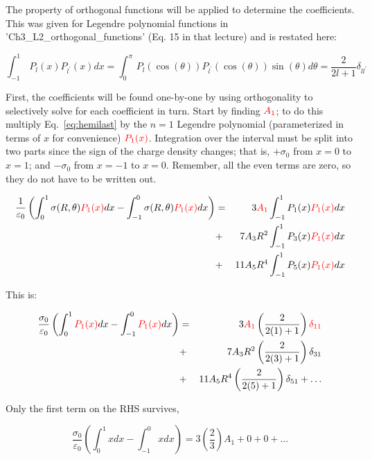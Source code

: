 \documentclass[12pt]{article}
\begin{document}
\begin{flushleft}
The property of orthogonal functions will be applied to determine the coefficients.  This was given for Legendre polynomial functions in 'Ch3\_L2\_orthogonal\_functions' (Eq. 15 in that lecture) and is restated here:

\begin{equation*}
\int_{-1}^{1} \, P_{l}(x)P_{l^{\prime}}(x) dx = \int_{0}^{\pi} \, P_{l}(\cos{(\theta)})P_{l^{\prime}}(\cos{(\theta)})\sin{(\theta)}d\theta = \frac{2}{2l+1} \delta_{ll^{\prime}}
\end{equation*}

First, the coefficients will be found one-by-one by using orthogonality to selectively solve for each coefficient in turn.  Start by finding $\textcolor{red} {A_{1}}$; to do this multiply Eq.~\ref{eq:hemilast} by the $n=1$ Legendre polynomial (parameterized in terms of $x$ for convenience) $\textcolor{red} {P_{1}(x)}$.  Integration over the interval must be split into two parts since the sign of the charge density changes; that is,  $+\sigma_{0}$ from $x=0$ to $x=1$; and $-\sigma_{0}$ from $x=-1$ to $x=0$.  Remember, all the even terms are zero, so they do not have to be written out.

\begin{eqnarray*}
\frac{1}{\varepsilon_{0}}\left( \int_{0}^{1} \sigma(R,\theta)\textcolor{red} {P_{1}(x)} dx -  \int_{-1}^{0} \sigma(R,\theta) \textcolor{red} {P_{1}(x)} dx \right) & = & 3\textcolor{red} {A_{1}} \int_{-1}^{1} P_{1}(x) \textcolor{red}{P_{1}(x)} dx \\
& + & 7A_{3} R^{2} \int_{-1}^{1} P_{3}(x) \textcolor{red}{P_{1}(x)} dx \\
& + & 11A_{5} R^{4} \int_{-1}^{1} P_{5}(x) \textcolor{red}{P_{1}(x)} dx 
\end{eqnarray*}

This is:

\begin{eqnarray*}
\frac{\sigma_{0}}{\varepsilon_{0}} \left( \int_{0}^{1} \textcolor{red} {P_{1}(x)} dx - \int_{-1}^{0} \textcolor{red} {P_{1}(x)} dx \right) & =  & 3 \textcolor{red} {A_{1}} \left( \frac{2}{2(1)+1} \right) \textcolor{red} {\delta_{11}}\\
& + & 7A_{3}R^{2}   \left( \frac{2}{2(3)+1} \right) \delta_{31}\\
& + & 11A_{5} R^{4} \left( \frac{2}{2(5)+1} \right) \delta_{51}   + \ldots
\end{eqnarray*}

Only the first term on the RHS survives,

\begin{equation*}
\frac{\sigma_{0}}{\varepsilon_{0}} \left( \int_{0}^{1}  x dx - \int_{-1}^{0} x dx \right) =  3\left( \frac{2}{3} \right) A_{1}   + 0 + 0 + \ldots 
\end{equation*}


\end{flushleft}
\end{document}
